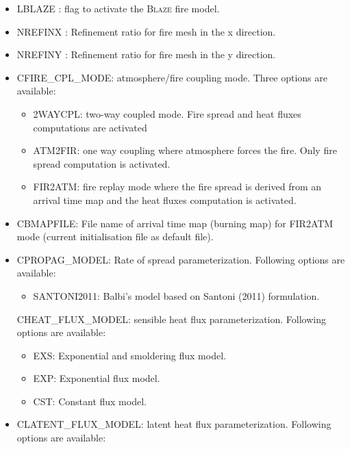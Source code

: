 \begin{itemize}
  \item
  LBLAZE : flag to activate the \textsc{Blaze} fire model.
  \item
  NREFINX : Refinement ratio for fire mesh in the x direction.
  \item
  NREFINY : Refinement ratio for fire mesh in the y direction.
  \item
  CFIRE\_CPL\_MODE: atmosphere/fire coupling mode. Three options are available:
  \begin{itemize}
    \item 2WAYCPL: two-way coupled mode. Fire spread and heat fluxes computations are activated
    \item ATM2FIR: one way coupling where atmosphere forces the fire. Only fire spread computation is activated.
    \item FIR2ATM: fire replay mode where the fire spread is derived from an arrival time map and the heat fluxes computation is activated.
  \end{itemize}
  \item
  CBMAPFILE: File name of arrival time map (burning map) for FIR2ATM mode (current initialisation file as default file).
  \item
  CPROPAG\_MODEL: Rate of spread parameterization. Following options are available:
  \begin{itemize}
    \item SANTONI2011: Balbi's model based on Santoni (2011) formulation.
  \end{itemize}
  CHEAT\_FLUX\_MODEL: sensible heat flux parameterization. Following options are available:
  \begin{itemize}
    \item EXS: Exponential and smoldering flux model.
    \item EXP: Exponential flux model.
    \item CST: Constant flux model.
  \end{itemize}
  \item
  CLATENT\_FLUX\_MODEL: latent heat flux parameterization. Following options are available:
  \begin{itemize}

\end{itemize}
\end{itemize}

